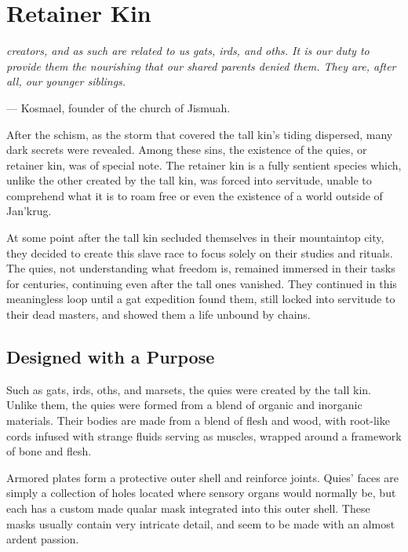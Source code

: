 \section{Retainer Kin} \label{kin::quies}
\textit{creators, and as such are related to us gats, irds, and oths.
It is our duty to provide them the nourishing that our shared parents denied them.
They are, after all, our younger siblings.}

\hspace*{\fill} --- Kosmael, founder of the church of Jismuah.

After the schism, as the storm that covered the tall kin's tiding dispersed, many dark secrets were revealed.
Among these sins, the existence of the quies, or retainer kin, was of special note.
The retainer kin is a fully sentient species which, unlike the other created by the tall kin, was forced into servitude, unable to comprehend what it is to roam free or even the existence of a world outside of Jan'krug.

At some point after the tall kin secluded themselves in their mountaintop city, they decided to create this slave race to focus solely on their studies and rituals.
The quies, not understanding what freedom is, remained immersed in their tasks for centuries, continuing even after the tall ones vanished.
They continued in this meaningless loop until a gat expedition found them, still locked into servitude to their dead masters, and showed them a life unbound by chains.

\subsection*{Designed with a Purpose}
    Such as gats, irds, oths, and marsets, the quies were created by the tall kin.
    Unlike them, the quies were formed from a blend of organic and inorganic materials.
    Their bodies are made from a blend of flesh and wood, with root-like cords infused with strange fluids serving as muscles, wrapped around a framework of bone and flesh.

    Armored plates form a protective outer shell and reinforce joints.
    Quies' faces are simply a collection of holes located where sensory organs would normally be, but each has a custom made qualar mask integrated into this outer shell.
    These masks usually contain very intricate detail, and seem to be made with an almost ardent passion.

